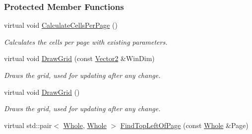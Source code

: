 \subsubsection*{Protected Member Functions}
\begin{DoxyCompactItemize}
\item 
\hypertarget{classphys_1_1UI_1_1PagedCellGrid_a635b2821bf9876a21d91da749ec9db79}{
virtual void \hyperlink{classphys_1_1UI_1_1PagedCellGrid_a635b2821bf9876a21d91da749ec9db79}{CalculateCellsPerPage} ()}
\label{classphys_1_1UI_1_1PagedCellGrid_a635b2821bf9876a21d91da749ec9db79}

\begin{DoxyCompactList}\small\item\em Calculates the cells per page with existing parameters. \item\end{DoxyCompactList}\item 
\hypertarget{classphys_1_1UI_1_1PagedCellGrid_a85dedc7f0ed0a387b58486350a9c40a7}{
virtual void \hyperlink{classphys_1_1UI_1_1PagedCellGrid_a85dedc7f0ed0a387b58486350a9c40a7}{DrawGrid} (const \hyperlink{classphys_1_1Vector2}{Vector2} \&WinDim)}
\label{classphys_1_1UI_1_1PagedCellGrid_a85dedc7f0ed0a387b58486350a9c40a7}

\begin{DoxyCompactList}\small\item\em Draws the grid, used for updating after any change. \item\end{DoxyCompactList}\item 
\hypertarget{classphys_1_1UI_1_1PagedCellGrid_a9eb862a9e31767dd02bf8cf03178392e}{
virtual void \hyperlink{classphys_1_1UI_1_1PagedCellGrid_a9eb862a9e31767dd02bf8cf03178392e}{DrawGrid} ()}
\label{classphys_1_1UI_1_1PagedCellGrid_a9eb862a9e31767dd02bf8cf03178392e}

\begin{DoxyCompactList}\small\item\em Draws the grid, used for updating after any change. \item\end{DoxyCompactList}\item 
\hypertarget{classphys_1_1UI_1_1PagedCellGrid_aed3d35d22a9282d7603cd6f5ed0d7f1c}{
virtual std::pair$<$ \hyperlink{namespacephys_a460f6bc24c8dd347b05e0366ae34f34a}{Whole}, \hyperlink{namespacephys_a460f6bc24c8dd347b05e0366ae34f34a}{Whole} $>$ \hyperlink{classphys_1_1UI_1_1PagedCellGrid_aed3d35d22a9282d7603cd6f5ed0d7f1c}{FindTopLeftOfPage} (const \hyperlink{namespacephys_a460f6bc24c8dd347b05e0366ae34f34a}{Whole} \&Page)}
\label{classphys_1_1UI_1_1PagedCellGrid_aed3d35d22a9282d7603cd6f5ed0d7f1c}


\end{DoxyCompactItemize}
